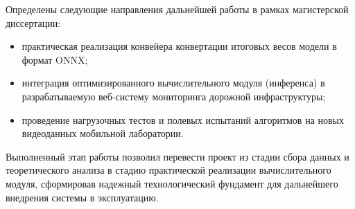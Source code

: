 \documentclass[a4paper,12pt]{article}
\begin{document}
Определены следующие направления дальнейшей работы в рамках магистерской диссертации:
\begin{itemize}
    \item практическая реализация конвейера конвертации итоговых весов модели в формат ONNX;
    \item интеграция оптимизированного вычислительного модуля (инференса) в разрабатываемую веб-систему мониторинга дорожной инфраструктуры;
    \item проведение нагрузочных тестов и полевых испытаний алгоритмов на новых видеоданных мобильной лаборатории.
\end{itemize}

Выполненный этап работы позволил перевести проект из стадии сбора данных и теоретического анализа в стадию практической реализации вычислительного модуля, сформировав надежный технологический фундамент для дальнейшего внедрения системы в эксплуатацию.

\newpage
\end{document}
